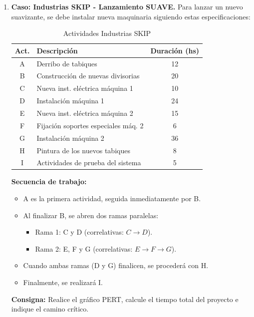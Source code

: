 \documentclass[../main]{subfiles}
\begin{document}
\begin{enumerate}
  \item \textbf{Caso: Industrias SKIP - Lanzamiento SUAVE.}
    Para lanzar un nuevo suavizante, se debe instalar nueva
    maquinaria siguiendo estas especificaciones:

    \begin{table}[h!]
      \centering
      \begin{tabular}{|c|l|c|} \hline
        \textbf{Act.} & \textbf{Descripción} & \textbf{Duración (hs)}
        \\ \hline \hline
        A & Derribo de tabiques & 12 \\
        B & Construcción de nuevas divisorias & 20 \\
        C & Nueva inst. eléctrica máquina 1 & 10 \\
        D & Instalación máquina 1 & 24 \\
        E & Nueva inst. eléctrica máquina 2 & 15 \\
        F & Fijación soportes especiales máq. 2 & 6 \\
        G & Instalación máquina 2 & 36 \\
        H & Pintura de los nuevos tabiques & 8 \\
        I & Actividades de prueba del sistema & 5 \\ \hline
      \end{tabular}
      \caption{Actividades Industrias SKIP}
      \label{tab:industrias_skip}
    \end{table}

    \textbf{Secuencia de trabajo:}
    \begin{itemize}
      \item A es la primera actividad, seguida inmediatamente por B.
      \item Al finalizar B, se abren dos ramas paralelas:
        \begin{itemize}
          \item Rama 1: C y D (correlativas: $C \rightarrow D$).
          \item Rama 2: E, F y G (correlativas: $E \rightarrow F
            \rightarrow G$).
        \end{itemize}
      \item Cuando ambas ramas (D y G) finalicen, se procederá con H.
      \item Finalmente, se realizará I.
    \end{itemize}

    \textbf{Consigna:} Realice el gráfico PERT, calcule el tiempo
    total del proyecto e indique el camino crítico.
\end{enumerate}
\end{document}
